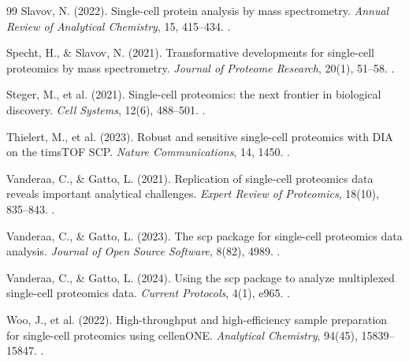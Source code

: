 \documentclass[11pt,twoside,openright]{book}
\begin{document}
\begin{thebibliography}{99}
Slavov, N. (2022). Single-cell protein analysis by mass spectrometry. \textit{Annual Review of Analytical Chemistry}, 15, 415--434. .

Specht, H., \& Slavov, N. (2021). Transformative developments for single-cell proteomics by mass spectrometry. \textit{Journal of Proteome Research}, 20(1), 51--58. .

Steger, M., et al. (2021). Single-cell proteomics: the next frontier in biological discovery. \textit{Cell Systems}, 12(6), 488--501. .

Thielert, M., et al. (2023). Robust and sensitive single-cell proteomics with DIA on the timsTOF SCP. \textit{Nature Communications}, 14, 1450. .

Vanderaa, C., \& Gatto, L. (2021). Replication of single-cell proteomics data reveals important analytical challenges. \textit{Expert Review of Proteomics}, 18(10), 835--843. .

Vanderaa, C., \& Gatto, L. (2023). The scp package for single-cell proteomics data analysis. \textit{Journal of Open Source Software}, 8(82), 4989. .

Vanderaa, C., \& Gatto, L. (2024). Using the scp package to analyze multiplexed single-cell proteomics data. \textit{Current Protocols}, 4(1), e965. .

Woo, J., et al. (2022). High-throughput and high-efficiency sample preparation for single-cell proteomics using cellenONE. \textit{Analytical Chemistry}, 94(45), 15839--15847. .

\end{thebibliography}
\end{document}

